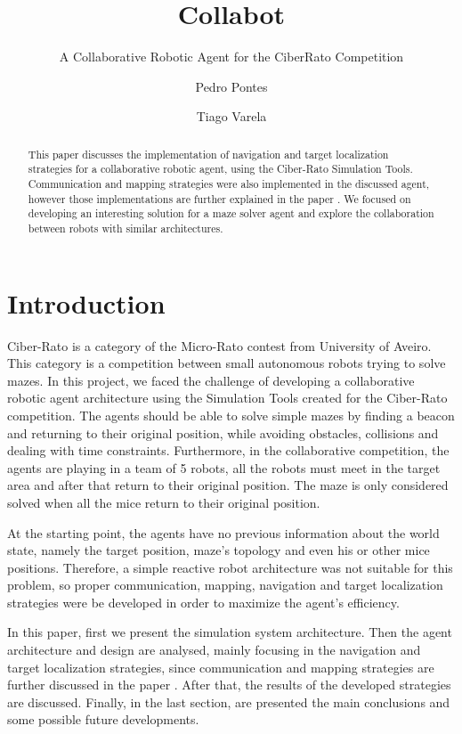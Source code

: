 \documentclass[oribibl]{llncs}
\title{Collabot}
\subtitle{A Collaborative Robotic Agent for the CiberRato Competition}
\author{Pedro Pontes \and Tiago Varela}
\institute{Faculdade de Engenharia da Universidade do Porto}
\begin{document}
\maketitle
\begin{abstract}
This paper discusses the implementation of navigation and target localization strategies for a  collaborative robotic agent, using the Ciber-Rato Simulation Tools. Communication and mapping strategies were also implemented in the discussed agent, however those implementations are further explained in the paper \cite{baboehelder}.
We focused on developing an interesting solution for a maze solver agent and explore the collaboration between robots with similar architectures.
\end{abstract}

\section{Introduction}
Ciber-Rato is a category of the Micro-Rato contest from University of Aveiro.
This category is a competition between small autonomous robots trying to solve mazes. \cite{Lau2002}
In this project, we faced the challenge of developing a collaborative robotic agent architecture using the Simulation Tools created for the Ciber-Rato competition. The agents should be able to solve simple mazes by finding a beacon and returning to their original position, while avoiding obstacles, collisions and dealing with time constraints. Furthermore, in the collaborative competition, the agents are playing in a team of 5 robots, all the robots must meet in the target area and after that return to their original position. The maze is only considered solved when all the mice return to their original position.

At the starting point, the agents have no previous information about the world state, namely the target position, maze's topology and even his or other mice positions. Therefore, a simple reactive robot architecture was not suitable for this problem, so proper communication, mapping, navigation and target localization strategies were be developed in order to maximize the agent's efficiency.

In this paper, first we present the simulation system architecture. Then the agent architecture and design are analysed, mainly focusing in the navigation and target localization strategies, since communication and mapping strategies are further discussed in the paper \cite{baboehelder}. After that, the results of the developed strategies are discussed. Finally, in the last section, are presented the main conclusions and some possible future developments.
\end{document}

